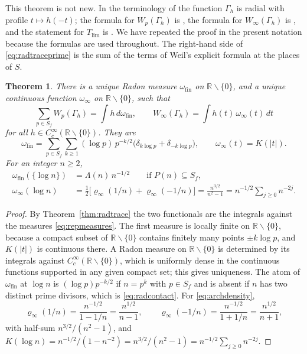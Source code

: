 \documentclass[11pt]{amsart}
\newtheorem{theorem}{Theorem}[section]
\theoremstyle{definition}
\newcommand{\R}{\mathbb R}
\begin{document}
This theorem is not new. In the terminology of \cite{Companion} the
function $\Gamma_h$ is radial with profile $t\mapsto h(-t)$; the formula for
$W_p(\Gamma_h)$ is \cite[(82)]{Companion}, the formula for
$W_\infty(\Gamma_h)$ is \cite[(32)]{Companion}, and the statement for
$T_{\lim}$ is \cite[Lemma~A.1]{Companion}. We have repeated the proof in the
present notation because the formulas are used throughout. The right-hand
side of \eqref{eq:radtraceprime} is the sum of the terms of Weil's explicit
formula \cite{Weil1952} at the places of $S$.

\begin{theorem}\label{thm:repmeasures}
There is a unique Radon measure $\omega_{\mathrm{fin}}$ on
$\R\smallsetminus\{0\}$, and a unique continuous function $\omega_\infty$ on
$\R\smallsetminus\{0\}$, such that
\[
  \sum_{p\in S_f}W_p(\Gamma_h)=\int h\,d\omega_{\mathrm{fin}},\qquad
  W_\infty(\Gamma_h)=\int h(t)\,\omega_\infty(t)\,dt
\]
for all $h\in C_c^\infty(\R\smallsetminus\{0\})$. They are
\begin{equation}\label{eq:repmeasures}
  \omega_{\mathrm{fin}}=\sum_{p\in S_f}\sum_{k\ge1}(\log p)\,p^{-k/2}
    \bigl(\delta_{k\log p}+\delta_{-k\log p}\bigr),\qquad
  \omega_\infty(t)=K(|t|) .
\end{equation}
For an integer $n\ge2$,
\begin{align}
  \omega_{\mathrm{fin}}(\{\log n\})&=\Lambda(n)\,n^{-1/2}
     \qquad\text{if } P(n)\subseteq S_f,\label{eq:radcontact}\\
  \omega_\infty(\log n)&=\tfrac12\bigl[\varrho_\infty(1/n)+\varrho_\infty(-1/n)\bigr]
     =\frac{n^{3/2}}{n^2-1}=n^{-1/2}\sum_{j\ge0}n^{-2j}.\label{eq:archdensity}
\end{align}
\end{theorem}

\begin{proof}
By Theorem~\ref{thm:radtrace} the two functionals are the integrals against
the measures \eqref{eq:repmeasures}. The first measure is locally finite on
$\R\smallsetminus\{0\}$, because a compact subset of $\R\smallsetminus\{0\}$
contains finitely many points $\pm k\log p$, and $K(|t|)$ is continuous there.
A Radon measure on $\R\smallsetminus\{0\}$ is determined by its integrals
against $C_c^\infty(\R\smallsetminus\{0\})$, which is uniformly dense in the
continuous functions supported in any given compact set; this gives
uniqueness. The atom of $\omega_{\mathrm{fin}}$ at $\log n$ is
$(\log p)p^{-k/2}$ if $n=p^k$ with $p\in S_f$ and is absent if $n$ has two
distinct prime divisors, which is \eqref{eq:radcontact}. For
\eqref{eq:archdensity},
\[
  \varrho_\infty(1/n)=\frac{n^{-1/2}}{1-1/n}=\frac{n^{1/2}}{n-1},\qquad
  \varrho_\infty(-1/n)=\frac{n^{-1/2}}{1+1/n}=\frac{n^{1/2}}{n+1},
\]
with half-sum $n^{3/2}/(n^2-1)$, and
$K(\log n)=n^{-1/2}/(1-n^{-2})=n^{3/2}/(n^2-1)=n^{-1/2}\sum_{j\ge0}n^{-2j}$.
\end{proof}
\end{document}
